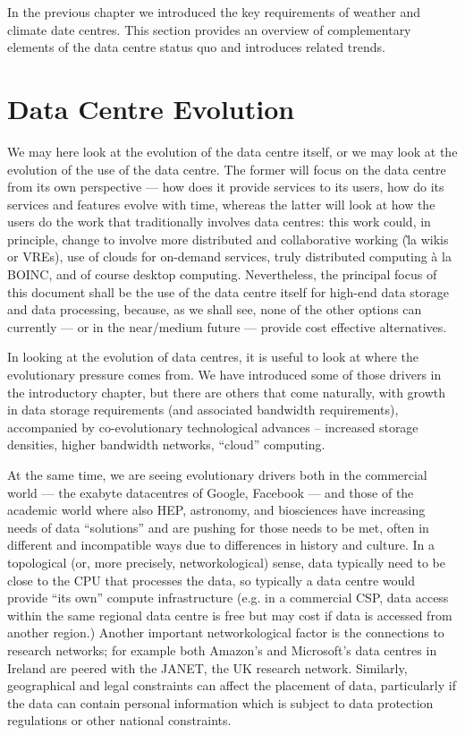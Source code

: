 \label{sec:related work}

In the previous chapter we introduced the key requirements of weather
and climate date centres. This section provides an overview of
complementary elements of the data centre status quo and introduces related trends.

\section{Data Centre Evolution}
\label{sec:related work/data centre evolution}

We may here look at the evolution of the data centre itself, or we may look at
the evolution of the use of the data centre.  The former will focus on the data
centre from its own perspective --- how does it provide services to its users,
how do its services and features evolve with time, whereas the latter will look
at how the users do the work that traditionally involves data centres: this work
could, in principle, change to involve more distributed and collaborative
working (\`la wikis or VREs), use of clouds for on-demand services, truly
distributed computing \`a la BOINC, and of course desktop computing.
Nevertheless, the principal focus of this document shall be the use of the data
centre itself for high-end data storage and data processing, because, as we
shall see, none of the other options can currently --- or in the near/medium
future --- provide cost effective alternatives.



In looking at the evolution of data centres, it is useful to look at where the
evolutionary pressure comes from. We have introduced some of those drivers in
the introductory chapter, but there are others that come naturally, with growth
in data storage requirements (and associated bandwidth requirements),
accompanied by co-evolutionary technological advances -- increased storage
densities, higher bandwidth networks, ``cloud'' computing.

At the same time, we are seeing evolutionary drivers both in the commercial
world --- the exabyte datacentres of Google, Facebook --- and those of the
academic world where also HEP, astronomy, and biosciences have increasing needs
of data ``solutions'' and are pushing for those needs to be met, often in
different and incompatible ways due to differences in history and culture.  In a
topological (or, more precisely, networkological) sense, data typically need to
be close to the CPU that processes the data, so typically a data centre would
provide ``its own'' compute infrastructure (e.g. in a commercial CSP, data
access within the same regional data centre is free but may cost if data is
accessed from another region.)  Another important networkological factor is the
connections to research networks; for example both Amazon's and Microsoft's data
centres in Ireland are peered with the JANET, the UK research network.
Similarly, geographical and legal constraints can affect the placement of data,
particularly if the data can contain personal information which is subject to
data protection regulations or other national constraints.

